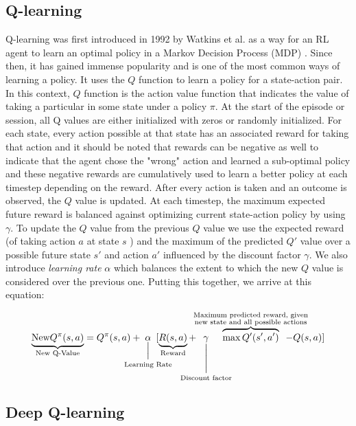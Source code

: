 \documentclass[acmsmall,review,authorversion]{acmart}
\begin{document}
\subsection{Q-learning}
\label{sub:qlearning}
Q-learning was first introduced in 1992 by Watkins et al. as a way for an RL agent to learn an optimal policy in a Markov Decision Process (MDP) \cite{Watkins92q-learning}. Since then, it has gained immense popularity and is one of the most common ways of learning a policy. It uses the $Q$ function to learn a policy for a state-action pair. In this context, $Q$ function is the action value function that indicates the value of taking a particular in some state under a policy $\pi$. At the start of the episode or session, all Q values are either initialized with zeros or randomly initialized. For each state, every action possible at that state has an associated reward for taking that action and it should be noted that rewards can be negative as well to indicate that the agent chose the "wrong" action and learned a sub-optimal policy and these negative rewards are cumulatively used to learn a better policy at each timestep depending on the reward. After every action is taken and an outcome is observed, the $Q$ value is updated. At each timestep, the maximum expected future reward is balanced against optimizing current state-action policy by using $\gamma$. To update the $Q$ value from the previous $Q$ value we use the expected reward (of taking action $a$ at state $s$ ) and the maximum of the predicted $Q'$ value over a possible future state $s'$ and action $a'$ influenced by the discount factor $\gamma$. We also introduce \emph{learning rate} $\alpha$ which balances the extent to which the new $Q$ value is considered over the previous one. Putting this together, we arrive at this equation:


\[\underbrace{\text{New}Q^{\pi}(s,a)}_{\scriptstyle\text{New  Q-Value}}=Q^{\pi}(s,a)+\mkern-34mu\underset{\text{Learning Rate}}{\underset{\Bigl|}{\alpha}}\mkern-30mu[\underbrace{R(s,a)}_{\scriptstyle\text{Reward}}+\mkern-30mu\underset{\text{Discount factor}}{\underset{\Biggl|}{\gamma}}\mkern-75mu\overbrace{\max Q'(s',a')}^{\scriptstyle\substack{\text{Maximum predicted reward, given} \\ \text{new state and all possible actions}}}\mkern-45mu-Q(s,a)]\]


\subsection{Deep Q-learning}
\label{sub:deep_q}
\end{document}
